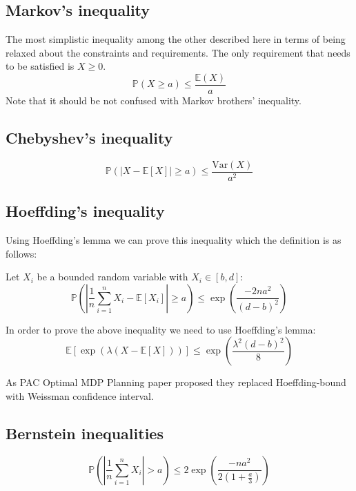 \documentclass[letterpaper,12pt]{article}
\begin{document}
\subsection{Markov's inequality}
The most simplistic inequality among the other described here in terms of being relaxed about the constraints and requirements. The only requirement that needs to be satisfied is $X \geq 0$.
\begin{equation}
\mathbb {P}(X \geq a ) \leq \frac { \mathbb { E}( X ) } { a }
\end{equation}
Note that it should be not confused with Markov brothers' inequality.

\subsection{Chebyshev's inequality}
\begin{equation}
\mathbb {P}(|X - \mathbb{E}[X]| \geq a ) \leq \frac { \mathrm { Var}( X ) } { a^2 }
\end{equation}


\subsection{Hoeffding's inequality}
Using Hoeffding's lemma we can prove this inequality which the definition is as follows:

Let $X_i$ be a bounded random variable with $X_i \in [b, d]$:
\begin{equation}
    \mathbb {P} \left( \left| \frac{1}{n} \sum_{i=1}^{n} X_i - \mathbb{E}[X_i] \right| \geq a \right) \leq { \exp \left( \frac{-2 n a ^ {2} }{ \left(d-b \right) ^ 2} \right) }
\end{equation}

In order to prove the above inequality we need to use Hoeffding's lemma:
\begin{equation}
    \mathbb {E} \left[ \exp \left( {\lambda ( X - \mathbb {E}[X] )} \right)  \right] \leq \exp \left( \frac{\lambda ^ 2 (d-b)^2}{8} \right)
\end{equation}

As PAC Optimal MDP Planning paper \cite{AlkaeeTaleghan2015a} proposed they replaced Hoeffding-bound with Weissman confidence interval.

\subsection{Bernstein inequalities}
\begin{equation}
    \mathbb { P } \left( \left| \frac { 1 } { n } \sum _ { i = 1 } ^ { n } X _ { i } \right| > a \right) \leq 2 \exp \left( \frac {- n a ^ {2} } { 2 \left( 1 + \frac {a} {3} \right) } \right)
\end{equation}
\end{document}
